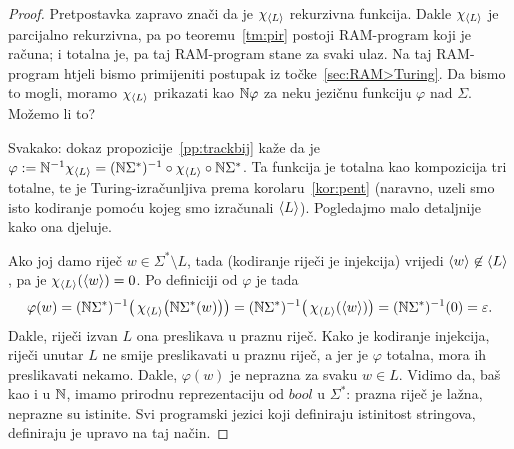 \begin{proof}
Pretpostavka zapravo znači da je $\chi_{\langle L\rangle}$ rekurzivna funkcija. Dakle $\chi_{\langle L\rangle}$ je parcijalno rekurzivna, pa po teoremu~\ref{tm:pir} postoji RAM-program koji je računa; i totalna je, pa taj RAM-program stane za svaki ulaz. Na taj RAM-program htjeli bismo primijeniti postupak iz točke~\ref{sec:RAM>Turing}. Da bismo to mogli, moramo $\chi_{\langle L\rangle}$ prikazati kao ${\mathbb N}\varphi$ za neku jezičnu funkciju $\varphi$ nad $\Sigma$. Možemo li to?

Svakako: dokaz propozicije~\ref{pp:trackbij} kaže da je $\varphi:={\mathbb N}^{-1}\chi_{\langle L\rangle}=({\mathbb N}\Sigma^*)^{-1}\circ\chi_{\langle L\rangle}\circ{\mathbb N}\Sigma^*$. Ta funkcija je totalna kao kompozicija tri totalne, te je Turing-izračunljiva prema korolaru~\ref{kor:pent} (naravno, uzeli smo isto kodiranje pomoću kojeg smo izračunali $\langle L\rangle$). Pogledajmo malo detaljnije kako ona djeluje.

Ako joj damo riječ $w\in\Sigma^*\setminus L$, tada (kodiranje riječi je injekcija) vrijedi $\langle w\rangle\not\in\langle L\rangle$, pa je $\chi_{\langle L\rangle}(\langle w\rangle)=0$. Po definiciji od $\varphi$ je tada
\begin{equation}
    \varphi(w)=({\mathbb N}\Sigma^*)^{-1}\bigl(\,\chi_{\langle L\rangle}\bigl({\mathbb N}\Sigma^*(w)\bigr)\bigr)=({\mathbb N}\Sigma^*)^{-1}\bigl(\,\chi_{\langle L\rangle}(\langle w\rangle)\bigr)=({\mathbb N}\Sigma^*)^{-1}(0)=\varepsilon\text.
\end{equation}
Dakle, riječi izvan $L$ ona preslikava u praznu riječ. Kako je kodiranje injekcija, riječi unutar $L$ ne smije preslikavati u praznu riječ, a jer je $\varphi$ totalna, mora ih preslikavati nekamo. Dakle, $\varphi(w)$ je neprazna za svaku $w\in L$.
Vidimo da, baš kao i u ${\mathbb N}$, imamo prirodnu reprezentaciju od $bool$ u $\Sigma^*$: prazna riječ je lažna, neprazne su istinite. Svi programski jezici koji definiraju istinitost stringova, definiraju je upravo na taj način.



\end{proof}
